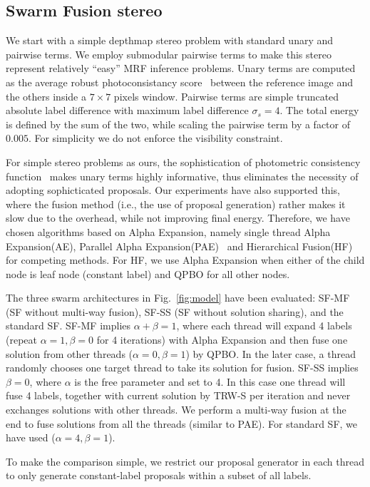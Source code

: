 \subsection{Swarm Fusion stereo}
We start with a simple depthmap stereo problem with standard unary and
pairwise terms. We employ submodular pairwise terms to make this
stereo represent relatively ``easy'' MRF inference problems.
%
Unary terms are computed as the average robust photoconsistancy
score~\cite{second_order_stereo} between the reference image and the others
inside a $7\times 7$ pixels window.  Pairwise terms are simple
truncated absolute label difference with maximum label difference
$\sigma_s=4$. The total energy is defined by the sum of the two, while
scaling the pairwise term by a factor of $0.005$. For simplicity we
do not enforce the visibility constraint.

%


\noindent For simple stereo problems as ours, the sophistication of
photometric consistency function~\cite{mvs_furukawa_survey} makes
unary terms highly informative, thus eliminates the necessity of
adopting sophicticated proposals. Our experiments have also supported
this, where the fusion method (i.e., the use of proposal generation)
rather makes it slow due to the overhead, while not improving final
energy. Therefore, we have chosen algorithms based on Alpha Expansion,
namely single thread Alpha Expansion(AE), Parallel Alpha
Expansion(PAE)~\cite{fusion_moves_for_markov_random_field_optimization}
and Hierarchical Fusion(HF)~\cite{olga_hierarchical_alpha_expansion}
for competing methods. For HF, we use Alpha Expansion when either of
the child node is leaf node (constant label) and QPBO for all other
nodes.


\noindent The three swarm architectures in Fig.~\ref{fig:model} have
been evaluated: SF-MF (SF without multi-way fusion), SF-SS (SF without
solution sharing), and the standard SF.
%
SF-MF implies $\alpha+\beta=1$, where each thread will expand 4 labels
(repeat $\alpha=1, \beta=0$ for 4 iterations) with Alpha Expansion and
then fuse one solution from other threads ($\alpha=0, \beta=1$) by
QPBO. In the later case, a thread randomly chooses one target thread
to take its solution for fusion. SF-SS implies $\beta=0$, where
$\alpha$ is the free parameter and set to 4. In this case one thread
will fuse 4 labels, together with current solution by TRW-S per
iteration and never exchanges solutions with other threads. We perform
a multi-way fusion at the end to fuse solutions from all the threads
(similar to PAE). For standard SF, we have used ($\alpha=4, \beta=1$).

%
%
%
%
To make the comparison simple, we restrict our proposal generator
in each thread to only generate constant-label proposals within a
subset of all labels.
%
